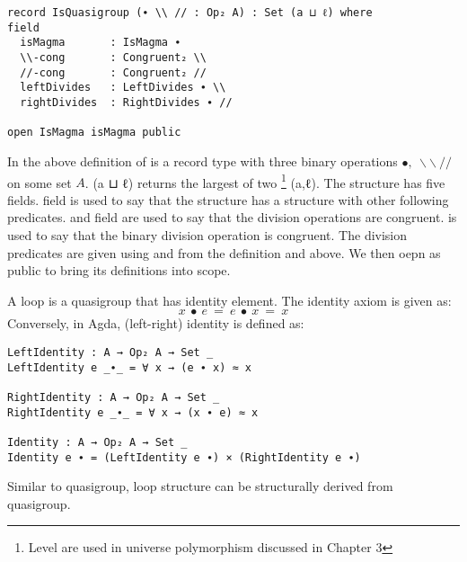 \begin{verbatim}
record IsQuasigroup (∙ \\ // : Op₂ A) : Set (a ⊔ ℓ) where
field
  isMagma       : IsMagma ∙
  \\-cong       : Congruent₂ \\
  //-cong       : Congruent₂ //
  leftDivides   : LeftDivides ∙ \\
  rightDivides  : RightDivides ∙ //

open IsMagma isMagma public
\end{verbatim}
In the above definition of  is a record type with three
binary operations $∙,\ \backslash\backslash \ //$ on some set $A$. (a ⊔ ℓ)
returns the largest of two  \footnote{Level are used in universe
polymorphism discussed in Chapter 3} (a,ℓ). The structure has five fields.
 field is used to say that the structure 
has a structure  with other following predicates.
 and  field are used to say that the division
operations are congruent.  is used to say that the
binary division operation is congruent.  The division predicates are given using
 and  from the definition
 and  above. We then oepn
 as public to bring its definitions into scope.

A loop is a quasigroup that has identity element. The identity axiom is given
as:
\begin{equation}\label{eq_lineslope}
x\ ∙\ e\ =\ e\ ∙\ x\ =\ x
\end{equation}
Conversely, in Agda, (left-right) identity is defined as:
\begin{verbatim}
LeftIdentity : A → Op₂ A → Set _
LeftIdentity e _∙_ = ∀ x → (e ∙ x) ≈ x

RightIdentity : A → Op₂ A → Set _
RightIdentity e _∙_ = ∀ x → (x ∙ e) ≈ x

Identity : A → Op₂ A → Set _
Identity e ∙ = (LeftIdentity e ∙) × (RightIdentity e ∙)
\end{verbatim}

Similar to quasigroup, loop structure can be structurally derived from
quasigroup.

